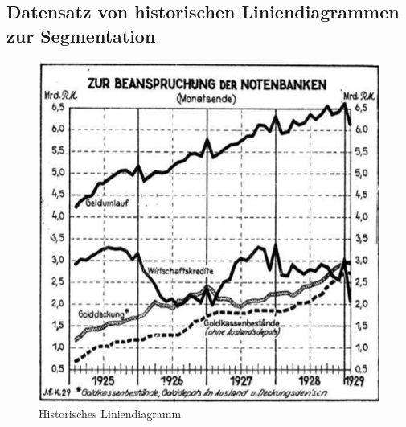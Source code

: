 \clearpage

\subsection{Datensatz von historischen Liniendiagrammen zur Segmentation}
\label{ch:lines}

\begin{figure}[H] %
    \centering
    \begin{minipage}{0.475\textwidth} %
        \centering
        \includegraphics[width=\linewidth]{Methodik/img/lines_historical.png}
        \caption{ Historisches Liniendiagramm \phantom{Platzhalter}}
        \label{fig:lines_historical}
    \end{minipage}\hfill %
    \begin{minipage}{0.475\textwidth} %
        \centering

\end{minipage}
\end{figure}
